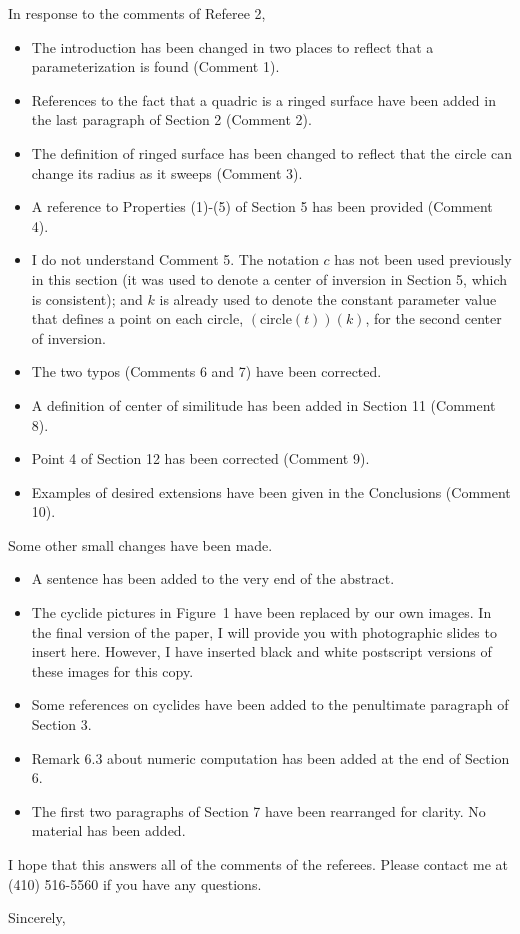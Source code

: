 \begin{letter}
\noindent In response to the comments of Referee 2,
\begin{itemize}
\item
	The introduction has been changed in two places to 
	reflect that a parameterization is found (Comment 1).
\item
	References to the fact that a quadric is a ringed surface
	have been added in the last paragraph of Section 2
	(Comment 2).
\item
	The definition of ringed surface has been changed to reflect that
	the circle can change its radius as it sweeps (Comment 3).
\item
	A reference to Properties (1)-(5) of Section 5 has been provided
	(Comment 4).
\item
	I do not understand Comment 5.
	The notation $c$ has not been used previously in this section
	(it was used to denote a center of inversion in Section 5, which
	is consistent); and $k$ is already used to denote the 
	constant parameter value that defines a point on each circle,
	$(\mbox{circle}(t))(k)$, for the second center of inversion.
\item
	The two typos (Comments 6 and 7) have been corrected.
\item
	A definition of center of similitude has been added in Section 11
	(Comment 8).
\item
	Point 4 of Section 12 has been corrected (Comment 9).
\item
	Examples of desired extensions have been given in the Conclusions
	(Comment 10).
\end{itemize}

\noindent Some other small changes have been made.
\begin{itemize}
\item
	A sentence has been added to the very end of the abstract.
\item
	The cyclide pictures in Figure~1  have been replaced by our own
	images.  In the final version of the paper, I will provide you with
	photographic slides to insert here.
	However, I have inserted black and white postscript versions
	of these images for this copy.
\item
	Some references on cyclides have been added to the penultimate
	paragraph of Section 3.
\item
	Remark 6.3 about numeric computation 
	has been added at the end of Section 6.
\item
	The first two paragraphs of Section 7 have been rearranged for clarity.
	No material has been added.
\end{itemize}

I hope that this answers all of the comments of the referees.
Please contact me at (410) 516-5560 if you have any questions.

\closing{Sincerely,}
\end{letter}

